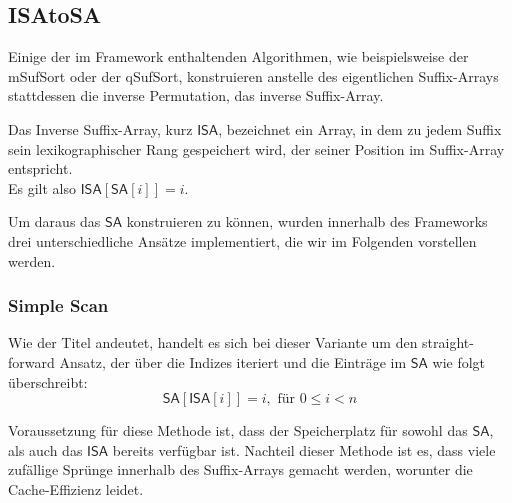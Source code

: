 \subsection{ISAtoSA}
\label{isa2sa}
Einige der im Framework enthaltenden Algorithmen, wie beispielsweise der mSufSort oder der qSufSort, konstruieren anstelle des eigentlichen Suffix-Arrays stattdessen die inverse Permutation, das inverse Suffix-Array. \\
\begin{definition}
Das Inverse Suffix-Array, kurz $\mathsf{ISA}$, bezeichnet ein Array, in dem zu jedem
Suffix sein lexikographischer Rang gespeichert wird, der seiner Position
im Suffix-Array entspricht.\\
Es gilt also $\mathsf{ISA}[\mathsf{SA}[i]]=i.$
\end{definition}
Um daraus das $\mathsf{SA}$ konstruieren zu können, wurden innerhalb des Frameworks drei unterschiedliche Ansätze implementiert, die wir im Folgenden vorstellen werden.
\subsubsection{Simple Scan}
\label{isa2sa:simplescan}
Wie der Titel andeutet, handelt es sich bei dieser Variante um den straight-forward Ansatz, der über die Indizes iteriert und die Einträge im $\mathsf{SA}$ wie folgt überschreibt:
\begin{equation}
\mathsf{SA}[\mathsf{ISA}[i]]=i, \text{ für } 0\leq i < n
\end{equation}

Voraussetzung für diese Methode ist, dass der Speicherplatz für sowohl das $\mathsf{SA}$, als auch das $\mathsf{ISA}$ bereits verfügbar ist. Nachteil dieser Methode ist es, dass viele zufällige Sprünge innerhalb des Suffix-Arrays gemacht werden, worunter die Cache-Effizienz leidet. 
